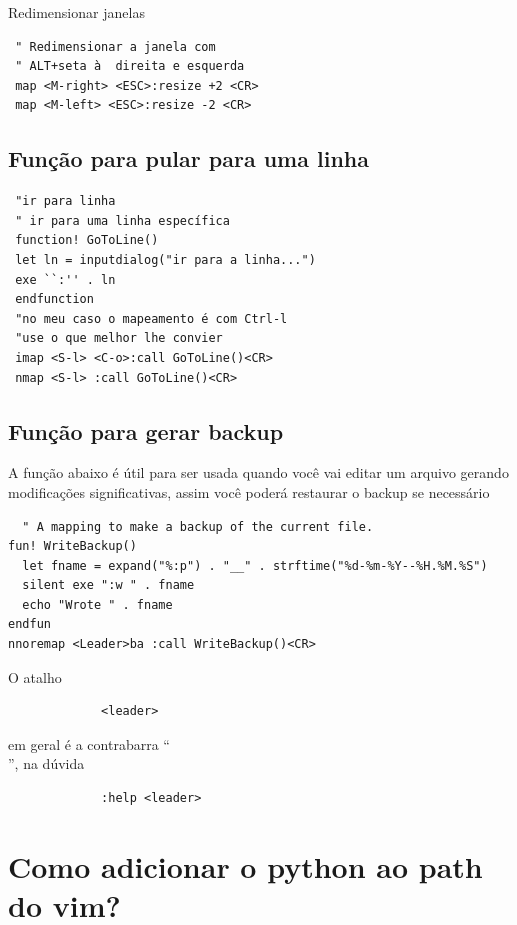 \documentclass[10pt,a4paper,openany]{book}
\begin{document}
Redimensionar janelas

\begin{verbatim}
 " Redimensionar a janela com
 " ALT+seta à  direita e esquerda
 map <M-right> <ESC>:resize +2 <CR>
 map <M-left> <ESC>:resize -2 <CR>
\end{verbatim}

\subsection{Função para pular para uma linha}
\label{Função para pular para uma linha}

\begin{verbatim}
 "ir para linha
 " ir para uma linha específica
 function! GoToLine()
 let ln = inputdialog("ir para a linha...")
 exe ``:'' . ln
 endfunction
 "no meu caso o mapeamento é com Ctrl-l
 "use o que melhor lhe convier
 imap <S-l> <C-o>:call GoToLine()<CR>
 nmap <S-l> :call GoToLine()<CR>
\end{verbatim}

\subsection{Função para gerar backup}
\label{Função para gerar backup}

A função abaixo é útil para ser usada quando você vai editar um arquivo
gerando modificações significativas, assim você poderá restaurar o backup se necessário

\begin{verbatim}
  " A mapping to make a backup of the current file.
fun! WriteBackup()
  let fname = expand("%:p") . "__" . strftime("%d-%m-%Y--%H.%M.%S")
  silent exe ":w " . fname
  echo "Wrote " . fname
endfun
nnoremap <Leader>ba :call WriteBackup()<CR>
\end{verbatim}

O atalho

\begin{verbatim}
			 <leader>
\end{verbatim}

em geral é a contrabarra ``\\'', na dúvida

\begin{verbatim}
			 :help <leader>
\end{verbatim}

\section{Como adicionar o python ao path do vim?}
\label{Como adicionar o python ao path do vim?}
\end{document}
